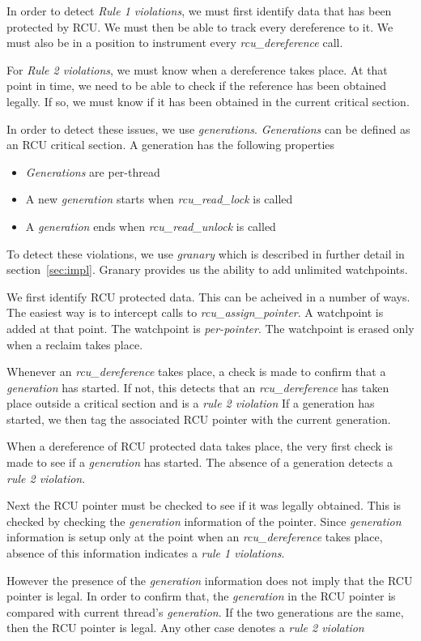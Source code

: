 In order to detect \emph{Rule 1 violations}, we must first identify data
that has been protected by RCU. We must then be able to track every
dereference to it. We must also be in a position to instrument
every \emph{rcu\_dereference} call.

For \emph{Rule 2 violations}, we must know when a dereference takes place.
At that point in time, we need to be able to check if the reference has
been obtained legally. If so, we must know if it has been obtained in
the current critical section.

In order to detect these issues, we use \emph{generations}. \emph{Generations}
can be defined as an RCU critical section. A generation has the following
properties

\begin{itemize}

\item \emph{Generations} are per-thread
\item A new \emph{generation} starts when \emph{rcu\_read\_lock} is called
\item A \emph{generation} ends when \emph{rcu\_read\_unlock} is called

\end{itemize}

To detect these violations, we use \emph{granary} which is described in
further detail in section~\ref{sec:impl}. Granary provides us the ability
to add unlimited watchpoints.

We first identify RCU protected data.
This can be acheived in a number of ways. The easiest way is to intercept calls
to \emph{rcu\_assign\_pointer}. A watchpoint is added at that point. The watchpoint
is \emph{per-pointer}. The watchpoint is erased only when a reclaim takes place.

Whenever an \emph{rcu\_dereference} takes place, a check is made to confirm that
a \emph{generation} has started. If not, this detects that an \emph{rcu\_dereference}
has taken place outside a critical section and is a \emph{rule 2 violation} If a
generation has started, we then tag the associated RCU pointer with the current
generation.

When a dereference of RCU protected data takes place, the very first check is made
to see if a \emph{generation} has started. The absence of a generation detects
a \emph{rule 2 violation}.

Next the RCU pointer must be checked to see if it was legally obtained. This is checked by checking the
\emph{generation} information of the pointer. Since \emph{generation} information
is setup only at the point when an \emph{rcu\_dereference} takes place, absence
of this information indicates a \emph{rule 1 violations}.

However the presence of the \emph{generation} information does not imply that the RCU
pointer is legal. In order to confirm that, the \emph{generation} in the RCU pointer is
compared with current thread's \emph{generation}. If the two generations are the same,
then the RCU pointer is legal. Any other case denotes a \emph{rule 2 violation}
